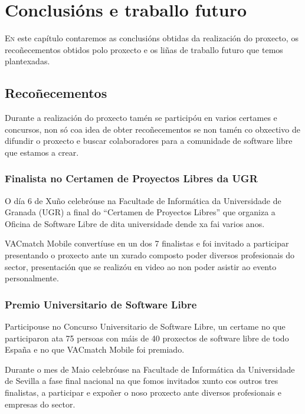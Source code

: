 \chapter{Conclusións e traballo futuro}
\minitoc


  \lettrine{E}{n} este capítulo contaremos as conclusións obtidas da 
realización do proxecto, os recoñecementos obtidos polo proxecto e os liñas de 
traballo futuro que temos plantexadas.

\section{Recoñecementos}

Durante a realización do proxecto tamén se participóu en varios certames e 
concursos, non só coa idea de obter recoñecementos se non tamén co obxectivo de 
difundir o proxecto e buscar colaboradores para a comunidade de software libre 
que estamos a crear.

  \subsection{Finalista no Certamen de Proyectos Libres da UGR}
  O día 6 de Xuño celebróuse na Facultade de Informática da Universidade de 
Granada (UGR) a final do ``Certamen de Proyectos Libres'' que organiza a 
Oficina de Software Libre de dita universidade dende xa fai varios anos.

  VACmatch Mobile convertíuse en un dos 7 finalistas e foi invitado a 
participar presentando o proxecto ante un xurado composto poder diversos 
profesionais do sector, presentación que se realizóu en video ao non 
poder asistir ao evento personalmente.

  \subsection{Premio Universitario de Software Libre}
  Participouse no Concurso Universitario de Software Libre, un certame no que 
participaron ata 75 persoas con máis de 40 proxectos de software libre de todo 
España e no que VACmatch Mobile foi premiado.

  Durante o mes de Maio celebróuse na Facultade de Informática da Universidade 
de Sevilla a fase final nacional na que fomos invitados xunto cos 
outros tres finalistas, a participar e expoñer o noso proxecto ante diversos 
profesionais e empresas do sector.

